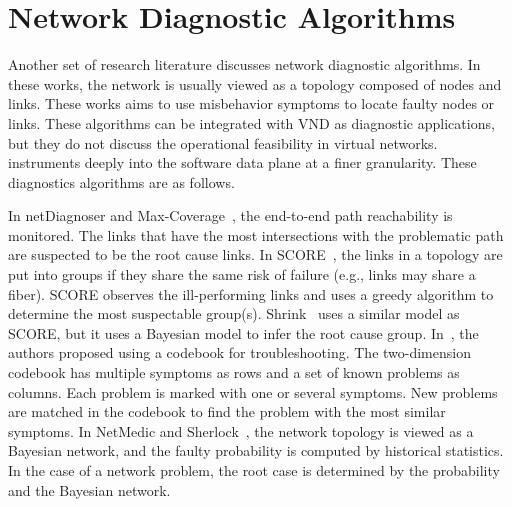\section{Network Diagnostic Algorithms}
Another set of research literature discusses network diagnostic algorithms.
In these works, the network is usually viewed as a topology composed of nodes and links. 
These works aims to use misbehavior symptoms to locate faulty nodes or links.
These algorithms can be integrated with VND as diagnostic applications, 
but they do not discuss the operational feasibility in virtual networks.
\Name instruments deeply into the software data plane at a finer granularity.
These diagnostics algorithms are as follows.

In netDiagnoser and Max-Coverage~\cite{netdiagnoser, maxcoverage}, the end-to-end path reachability is monitored. The links that 
have the most intersections with the problematic path are suspected to be the root cause links.
In SCORE~\cite{score}, the links in a topology are put into groups if they share the same risk of failure
(e.g., links may share a fiber). SCORE observes the ill-performing links and uses a greedy
algorithm to determine the most suspectable group(s). 
Shrink~\cite{shrink} uses a similar model as SCORE,
but it uses a Bayesian model to infer the root cause group. In~\cite{codebook}, the authors
proposed using a codebook for troubleshooting. The two-dimension codebook has multiple symptoms 
as rows and a set of known problems as columns. Each problem is marked with one or several
symptoms. New problems are matched in the codebook
to find the problem with the most similar symptoms. 
In NetMedic and Sherlock~\cite{netmedic, sherlock}, 
the network topology is viewed
as a Bayesian network, and the faulty probability is computed by historical statistics. In the
case of a network problem, the root case is determined by the probability and the Bayesian network.




